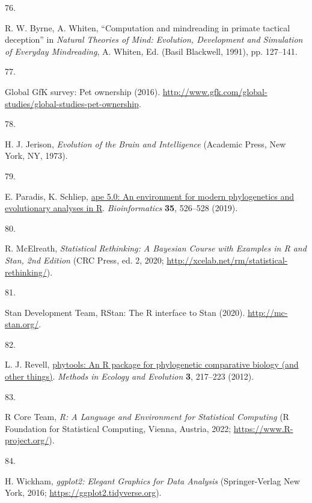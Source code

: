 \documentclass[
  man,floatsintext]{apa6}
\newlength{\cslhangindent}
\newlength{\csllabelwidth}
\newlength{\cslentryspacingunit} %
\newenvironment{CSLReferences}[2] %
 {%
  \setlength{\parindent}{0pt}
  \ifodd #1
  \let\oldpar\par
  \def\par{\hangindent=\cslhangindent\oldpar}
  \fi
  \setlength{\parskip}{#2\cslentryspacingunit}
 }%
 {}
\newcommand{\CSLLeftMargin}[1]{\parbox[t]{\csllabelwidth}{#1}}
\newcommand{\CSLRightInline}[1]{\parbox[t]{\linewidth - \csllabelwidth}{#1}\break}
\begin{document}
\begin{CSLReferences}{0}{0}
\leavevmode{}%
\CSLLeftMargin{76. }%
\CSLRightInline{R. W. Byrne, A. Whiten, {``Computation and mindreading in primate tactical deception''} in \emph{Natural Theories of Mind: Evolution, Development and Simulation of Everyday Mindreading}, A. Whiten, Ed. (Basil Blackwell, 1991), pp. 127--141.}

\leavevmode{}%
\CSLLeftMargin{77. }%
\CSLRightInline{Global GfK survey: Pet ownership (2016). \url{http://www.gfk.com/global-studies/global-studies-pet-ownership}.}

\leavevmode{}%
\CSLLeftMargin{78. }%
\CSLRightInline{H. J. Jerison, \emph{Evolution of the Brain and Intelligence} (Academic Press, New York, NY, 1973).}

\leavevmode{}%
\CSLLeftMargin{79. }%
\CSLRightInline{E. Paradis, K. Schliep, \href{https://doi.org/10.1093/bioinformatics/bty633}{{ape} 5.0: An environment for modern phylogenetics and evolutionary analyses in {R}}. \emph{Bioinformatics} \textbf{35}, 526--528 (2019).}

\leavevmode{}%
\CSLLeftMargin{80. }%
\CSLRightInline{R. McElreath, \emph{Statistical Rethinking: A {Bayesian} Course with Examples in {R} and {Stan}, 2nd Edition} (CRC Press, ed. 2, 2020; \url{http://xcelab.net/rm/statistical-rethinking/}).}

\leavevmode{}%
\CSLLeftMargin{81. }%
\CSLRightInline{Stan Development Team, {RStan}: The {R} interface to {Stan} (2020). \url{http://mc-stan.org/}.}

\leavevmode{}%
\CSLLeftMargin{82. }%
\CSLRightInline{L. J. Revell, \href{https://doi.org/10.1111/j.2041-210X.2011.00169.x}{{phytools}: An {R} package for phylogenetic comparative biology (and other things)}. \emph{Methods in Ecology and Evolution} \textbf{3}, 217--223 (2012).}

\leavevmode{}%
\CSLLeftMargin{83. }%
\CSLRightInline{R Core Team, \emph{R: A Language and Environment for Statistical Computing} (R Foundation for Statistical Computing, Vienna, Austria, 2022; \url{https://www.R-project.org/}).}

\leavevmode{}%
\CSLLeftMargin{84. }%
\CSLRightInline{H. Wickham, \emph{{ggplot2}: Elegant Graphics for Data Analysis} (Springer-Verlag New York, 2016; \url{https://ggplot2.tidyverse.org}).}


\end{CSLReferences}
\end{document}
